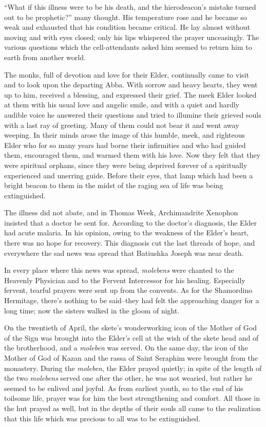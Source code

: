 ``What if this illness were to be his death, and the hierodeacon's mistake turned out to be prophetic?'' many thought. His temperature rose and he became so weak and exhausted that his condition became critical. He lay almost without moving and with eyes closed; only his lips whispered the prayer unceasingly. The various questions which the cell-attendants asked him seemed to return him to earth from another world.

The monks, full of devotion and love for their Elder, continually came to visit and to look upon the departing Abba. With sorrow and heavy hearts, they went up to him, received a blessing, and expressed their grief. The meek Elder looked at them with his usual love and angelic smile, and with a quiet and hardly audible voice he answered their questions and tried to illumine their grieved souls with a last ray of greeting. Many of them could not bear it and went away weeping. In their minds arose the image of this humble, meek, and righteous Elder who for so many years had borne their infirmities and who had guided them, encouraged them, and warmed them with his love. Now they felt that they were spiritual orphans, since they were being deprived forever of a spiritually experienced and unerring guide. Before their eyes, that lamp which had been a bright beacon to them in the midst of the raging sea of life was being extinguished.

The illness did not abate, and in Thomas Week, Archimandrite Xenophon insisted that a doctor be sent for. According to the doctor's diagnosis, the Elder had acute malaria. In his opinion, owing to the weakness of the Elder's heart, there was no hope for recovery. This diagnosis cut the last threads of hope, and everywhere the sad news was spread that Batiushka Joseph was near death.

In every place where this news was spread, \textit{molebens} were chanted to the Heavenly Physician and to the Fervent Intercessor for his healing. Especially fervent, tearful prayers were sent up from the convents. As for the Shamordino Hermitage, there's nothing to be said--they had felt the approaching danger for a long time; now the sisters walked in the gloom of night.

On the twentieth of April, the skete's wonderworking icon of the Mother of God of the Sign was brought into the Elder's cell at the wish of the skete head and of the brotherhood, and a \textit{moleben} was served. On the same day, the icon of the Mother of God of Kazan and the rassa of Saint Seraphim were brought from the monastery. During the \textit{moleben}, the Elder prayed quietly; in spite of the length of the two \textit{molebens} served one after the other, he was not wearied, but rather he seemed to be enlived and joyful. As from earliest youth, so to the end of his toilsome life, prayer was for him the best strengthening and comfort. All those in the hut prayed as well, but in the depths of their souls all came to the realization that this life which was precious to all was to be extinguished.

